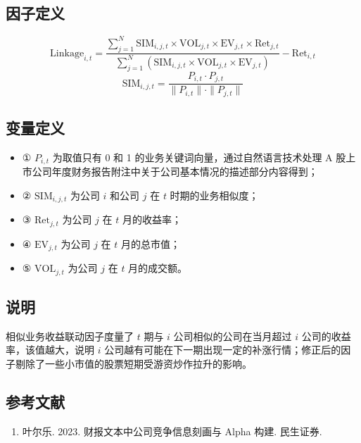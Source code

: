 \documentclass{article}
\begin{document}
\subsection{因子定义}

\begin{equation}
    \mathrm{Linkage}_{i,t} = \frac{\sum_{j=1}^{N} \mathrm{SIM}_{i,j,t} \times \mathrm{VOL}_{j,t} \times \mathrm{EV}_{j,t} \times \mathrm{Ret}_{j,t}}{\sum_{j=1}^{N} (\mathrm{SIM}_{i,j,t} \times \mathrm{VOL}_{j,t} \times \mathrm{EV}_{j,t})} - \mathrm{Ret}_{i,t}
\end{equation}
\begin{equation}
    \mathrm{SIM}_{i,j,t} = \frac{P_{i,t} \cdot P_{j,t}}{\|P_{i,t}\| \cdot \|P_{j,t}\|}
\end{equation}

\subsection{变量定义}
\begin{itemize}
    \item ① \( P_{i,t} \) 为取值只有 0 和 1 的业务关键词向量，通过自然语言技术处理 A 股上市公司年度财务报告附注中关于公司基本情况的描述部分内容得到；
    \item ② \( \mathrm{SIM}_{i,j,t} \) 为公司 \( i \) 和公司 \( j \) 在 \( t \) 时期的业务相似度；
    \item ③ \( \mathrm{Ret}_{j,t} \) 为公司 \( j \) 在 \( t \) 月的收益率；
    \item ④ \( \mathrm{EV}_{j,t} \) 为公司 \( j \) 在 \( t \) 月的总市值；
    \item ⑤ \( \mathrm{VOL}_{j,t} \) 为公司 \( j \) 在 \( t \) 月的成交额。
\end{itemize}

\subsection{说明}
相似业务收益联动因子度量了 \( t \) 期与 \( i \) 公司相似的公司在当月超过 \( i \) 公司的收益率，该值越大，说明 \( i \) 公司越有可能在下一期出现一定的补涨行情；修正后的因子剔除了一些小市值的股票短期受游资炒作拉升的影响。

\subsection{参考文献}
\begin{enumerate}
    \item 叶尔乐. 2023. 财报文本中公司竞争信息刻画与 Alpha 构建. 民生证券.
\end{enumerate}
\end{document}
